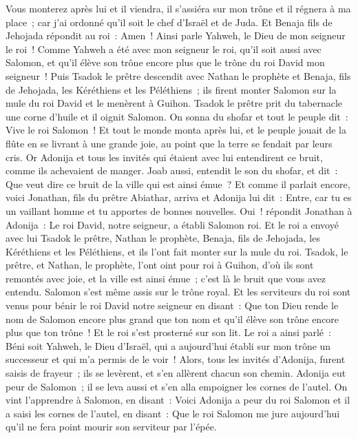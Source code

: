 \begin{multicols}{2}
Vous monterez après lui et il viendra, il s'assiéra sur mon trône et il régnera à ma place~; car j'ai ordonné qu'il soit le chef d'Israël et de Juda.
Et Benaja fils de Jehojada répondit au roi~: Amen~! Ainsi parle Yahweh, le Dieu de mon seigneur le roi~!
Comme Yahweh a été avec mon seigneur le roi, qu'il soit aussi avec Salomon, et qu'il élève son trône encore plus que le trône du roi David mon seigneur~!
Puis Tsadok le prêtre descendit avec Nathan le prophète et Benaja, fils de Jehojada, les Kéréthiens et les Péléthiens~; ils firent monter Salomon sur la mule du roi David et le menèrent à Guihon.
Tsadok le prêtre prit du tabernacle une corne d'huile et il oignit Salomon. On sonna du shofar et tout le peuple dit~: Vive le roi Salomon~!
Et tout le monde monta après lui, et le peuple jouait de la flûte en se livrant à une grande joie, au point que la terre se fendait par leurs cris.
Or Adonija et tous les invités qui étaient avec lui entendirent ce bruit, comme ils achevaient de manger. Joab aussi, entendit le son du shofar, et dit~: Que veut dire ce bruit de la ville qui est ainsi émue~?
Et comme il parlait encore, voici Jonathan, fils du prêtre Abiathar, arriva et Adonija lui dit~: Entre, car tu es un vaillant homme et tu apportes de bonnes nouvelles.
Oui~! répondit Jonathan à Adonija~: Le roi David, notre seigneur, a établi Salomon roi.
Et le roi a envoyé avec lui Tsadok le prêtre, Nathan le prophète, Benaja, fils de Jehojada, les Kéréthiens et les Péléthiens, et ils l'ont fait monter sur la mule du roi.
Tsadok, le prêtre, et Nathan, le prophète, l'ont oint pour roi à Guihon, d'où ils sont remontés avec joie, et la ville est ainsi émue~; c'est là le bruit que vous avez entendu.
Salomon s'est même assis sur le trône royal.
Et les serviteurs du roi sont venus pour bénir le roi David notre seigneur en disant~: Que ton Dieu rende le nom de Salomon encore plus grand que ton nom et qu'il élève son trône encore plus que ton trône~! Et le roi s'est prosterné sur son lit.
Le roi a ainsi parlé~: Béni soit Yahweh, le Dieu d'Israël, qui a aujourd'hui établi sur mon trône un successeur et qui m'a permis de le voir~!
Alors, tous les invités d'Adonija, furent saisis de frayeur~; ils se levèrent, et s'en allèrent chacun son chemin.
Adonija eut peur de Salomon~; il se leva aussi et s'en alla empoigner les cornes de l'autel.
On vint l'apprendre à Salomon, en disant~: Voici Adonija a peur du roi Salomon et il a saisi les cornes de l'autel, en disant~: Que le roi Salomon me jure aujourd'hui qu'il ne fera point mourir son serviteur par l'épée.

\end{multicols}
